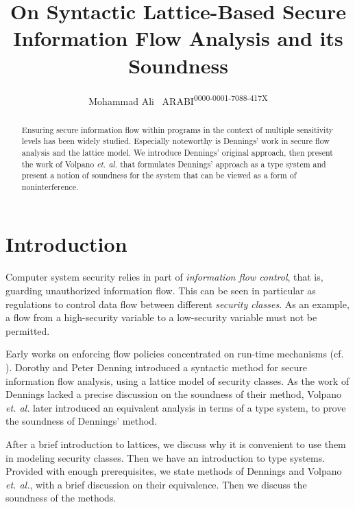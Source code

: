 \documentclass{llncs}
\begin{document}
\title{On Syntactic Lattice-Based Secure Information Flow Analysis and its Soundness}

\author{Mohammad Ali ~ARABI\textsuperscript{0000-0001-7088-417X}}
\maketitle
%
\begin{abstract}
Ensuring secure information flow within programs in the context of multiple sensitivity levels has been widely studied. Especially noteworthy is Dennings' work in secure flow analysis and the lattice model. We introduce Dennings' original approach, then present the work of Volpano \textit{et. al.} that formulates Dennings' approach as a type system and present a notion of soundness for the system that can be viewed as a form of noninterference.
\end{abstract}

\section{Introduction}
Computer system security relies in part of \textit{information flow control}, that is, guarding unauthorized information flow. This can be seen in particular as regulations to control data flow between different \textit{security classes}. As an example, a flow from a high-security variable to a low-security variable must not be permitted.

Early works on enforcing flow policies concentrated on run-time mechanisms (cf. \cite{Denning76}). Dorothy and Peter Denning \cite{Denning77} introduced a syntactic method for secure information flow analysis, using a lattice model of security classes. As the work of Dennings lacked a precise discussion on the soundness of their method, Volpano \textit{et. al.} \cite{VolpanoIS96} later introduced an equivalent analysis in terms of a type system, to prove the soundness of Dennings' method.

After a brief introduction to lattices, we discuss why it is convenient to use them in modeling security classes. Then we have an introduction to type systems. Provided with enough prerequisites, we state methods of Dennings and Volpano \textit{et. al.}, with a brief discussion on their equivalence. Then we discuss the soundness of the methods.
\end{document}
